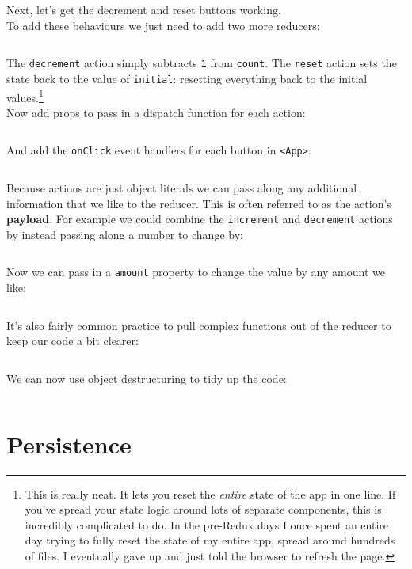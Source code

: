 \hr


Next, let's get the decrement and reset buttons working.
\\

To add these behaviours we just need to add two more reducers:

\inputminted{jsx}{01/figures/02/14-decrement.js}

The \texttt{decrement} action simply subtracts \texttt{1} from \texttt{count}. The \texttt{reset} action sets the state back to the value of \texttt{initial}: resetting everything back to the initial values.\footnote{This is really neat. It lets you reset the \textit{entire} state of the app in one line. If you've spread your state logic around lots of separate components, this is incredibly complicated to do. In the pre-Redux days I once spent an entire day trying to fully reset the state of my entire app, spread around hundreds of files. I eventually gave up and just told the browser to refresh the page.}
\\

Now add props to pass in a dispatch function for each action:

\inputminted{jsx}{01/figures/02/15-handlers.jsx}

And add the \texttt{onClick} event handlers for each button in \texttt{<App>}:

\inputminted{jsx}{01/figures/02/16-App.jsx}


Because actions are just object literals we can pass along any additional information that we like to the reducer. This is often referred to as the action's \textbf{payload}. For example we could combine the \texttt{increment} and \texttt{decrement} actions by instead passing along a number to change by:

\inputminted{jsx}{01/figures/02/17-change.js}

Now we can pass in a \texttt{amount} property to change the value by any amount we like:

\inputminted{jsx}{01/figures/02/18-change-action.js}


It's also fairly common practice to pull complex functions out of the reducer to keep our code a bit clearer:

\inputminted{js}{01/figures/02/19-change-fn.js}


We can now use object destructuring to tidy up the code:

\inputminted{jsx}{01/figures/02/20-destructure.js}


\section{Persistence}


